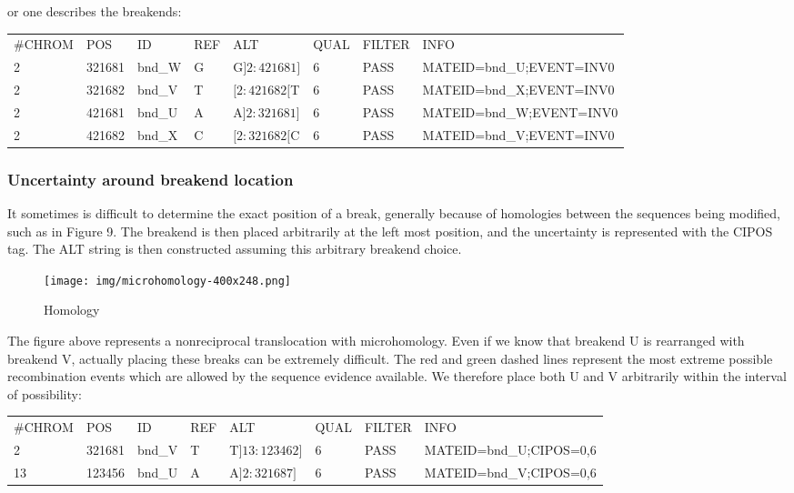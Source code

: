 \documentclass[8pt]{article}
\begin{document}
or one describes the breakends:

\vspace{0.3cm}
\footnotesize
\begin{tabular}{ l l l l l l l l }
\#CHROM & POS & ID & REF & ALT & QUAL & FILTER & INFO \\
2 & 321681 & bnd\_W & G & G$]2:421681]$ & 6 & PASS & MATEID=bnd\_U;EVENT=INV0 \\
2 & 321682 & bnd\_V & T & $[2:421682[$T & 6 & PASS & MATEID=bnd\_X;EVENT=INV0 \\
2 & 421681 & bnd\_U & A & A$]2:321681]$ & 6 & PASS & MATEID=bnd\_W;EVENT=INV0 \\
2 & 421682 & bnd\_X & C & $[2:321682[$C & 6 & PASS & MATEID=bnd\_V;EVENT=INV0 \\
\end{tabular}
\normalsize

\subsubsection{Uncertainty around breakend location}
It sometimes is difficult to determine the exact position of a break, generally because of homologies between the sequences being modified, such as in Figure 9.
The breakend is then placed arbitrarily at the left most position, and the uncertainty is represented with the CIPOS tag.
The ALT string is then constructed assuming this arbitrary breakend choice.

\begin{figure}[ht]
\centering
\texttt{[image: img/microhomology-400x248.png]}
\caption{Homology}
\end{figure}

The figure above represents a nonreciprocal translocation with microhomology.
Even if we know that breakend U is rearranged with breakend V, actually placing these breaks can be extremely difficult.
The red and green dashed lines represent the most extreme possible recombination events which are allowed by the sequence evidence available.
We therefore place both U and V arbitrarily within the interval of possibility:

\vspace{0.3cm}
\footnotesize
\begin{tabular}{ l l l l l l l l }
\#CHROM & POS & ID & REF & ALT & QUAL & FILTER & INFO \\
2 & 321681 & bnd\_V & T & T$]13:123462]$ & 6 & PASS & MATEID=bnd\_U;CIPOS=0,6 \\
13 & 123456 & bnd\_U & A & A$]2:321687]$ & 6 & PASS & MATEID=bnd\_V;CIPOS=0,6 \\
\end{tabular}
\normalsize
\vspace{0.3cm}
\end{document}
